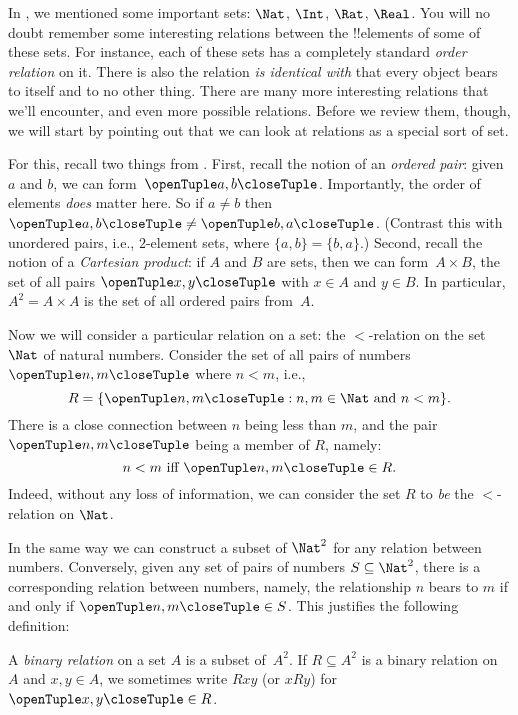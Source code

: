 \documentclass[../../../include/open-logic-section]{subfiles}
\begin{document}

\begin{explain}
In , we mentioned some important sets:
$\Nat$, $\Int$, $\Rat$, $\Real$. You will no doubt remember some
interesting relations between the !!{element}s of some of these sets.
For instance, each of these sets has a completely standard \emph{order
relation} on it.  There is also the relation \emph{is identical with}
that every object bears to itself and to no other thing. There are
many more interesting relations that we'll encounter, and even more
possible relations. Before we review them, though, we will start by
pointing out that we can look at relations as a special sort of set. 
  
For this, recall two things from . First,
recall the notion of an \emph{ordered pair}: given $a$ and $b$, we can
form~$\tuple{a, b}$. Importantly, the order of elements \emph{does}
matter here. So if $a \neq b$ then $\tuple{a, b} \neq \tuple{b, a}$.
(Contrast this with unordered pairs, i.e., $2$-element sets, where
$\{a, b\}=\{b, a\}$.) Second, recall the notion of a \emph{Cartesian
product}: if $A$ and $B$ are sets, then we can form~$A \times B$, the
set of all pairs $\tuple{x, y}$ with $x \in A$ and $y \in B$. In
particular, $A^{2}= A \times A$ is the set of all ordered pairs
from~$A$.
  
Now we will consider a particular relation on a set: the $<$-relation
on the set~$\Nat$ of natural numbers. Consider the set of all pairs of
numbers $\tuple{n, m}$ where $n<m$, i.e.,
\[
  R=\Setabs{\tuple{n, m}}{n, m \in \Nat \text{ and } n<m}.
\]
There is a close connection between $n$ being less than $m$, and the
pair $\tuple{n, m}$ being a member of $R$, namely:
\[
      n<m\text{ iff }\tuple{n, m} \in R.
\]
Indeed, without any loss of information, we can consider the set $R$
to \emph{be} the $<$-relation on $\Nat$. 

In the same way we can construct a subset of $\Nat^{2}$ for any
relation between numbers. Conversely, given any set of pairs of
numbers $S \subseteq \Nat^{2}$, there is a corresponding relation
between numbers, namely, the relationship $n$ bears to $m$ if and only
if $\tuple{n, m} \in S$. This justifies the following definition:
\end{explain}
  
\begin{defn} 
A \emph{binary relation} on a set $A$ is a subset of~$A^{2}$. If $R
\subseteq A^{2}$ is a binary relation on~$A$ and $x, y \in A$, we
sometimes write $Rxy$ (or $xRy$) for $\tuple{x, y} \in R$.
\end{defn}
  
\end{document}
